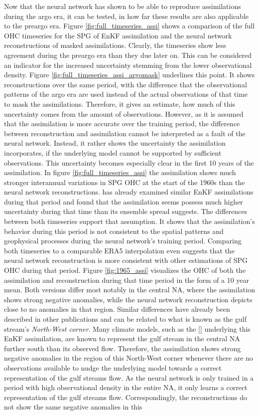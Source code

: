 \documentclass[11pt,a4paper]{scrreprt}	%
\begin{document}
	Now that the neural network has shown to be able to reproduce assimilations during the argo era, it can be tested, in how far these results are also applicable to the preargo era. Figure \ref{fig:full_timeseries_assi} shows a comparison of the full OHC timeseries for the SPG of EnKF assimilation and the neural network reconstructions of masked assimilations. Clearly, the timeseries show less agreement during the preargo era than they due later on. This can be considered an indicator for the increased uncertainty stemming from the lower observational density. Figure \ref{fig:full_timeseries_assi_argomask} underlines this point. It shows reconstructions over the same period, with the difference that the observational patterns of the argo era are used instead of the actual observations of that time to mask the assimilations. Therefore, it gives an estimate, how much of this uncertainty comes from the amount of observations. However, as it is assumed that the assimilation is more accurate over the training period, the difference between reconstruction and assimilation cannot be interpreted as a fault of the neural network. Instead, it rather shows the uncertainty the assimilation incorporates, if the underlying model cannot be supported by sufficient observations. This uncertainty becomes especially clear in the first 10 years of the assimilation. In figure \ref{fig:full_timeseries_assi} the assimilation shows much stronger interannual variations in SPG OHC at the start of the 1960s than the neural network reconstructions. \cite{vimal_personal} has already examined similar EnKF assimilations during that period and found that the assimilation seems possess much higher uncertainty during that time than its ensemble spread suggests. The differences between both timeseries support that assumption. It shows that the assimilation's behavior during this period is not consistent to the spatial patterns and geophysical processes during the neural network's training period. Comparing both timeseries to a comparable ERA5 interpolation even suggests that the neural network reconstruction is more consistent with other estimations of SPG OHC during that period. Figure \ref{fig:1965_assi} visualizes the OHC of both the assimilation and reconstruction during that time period in the form of a 10 year mean. Both versions differ most notably in the central NA, where the assimilation shows strong negative anomalies, while the neural network reconstruction depicts close to no anomalies in that region. Similar differences have already been described in other publications and can be related to what is known as the gulf stream's \textit{North-West corner}. Many climate models, such as the [] underlying this EnKF assimilation, are known to represent the gulf stream in the central NA further south than its observed flow. Therefore, the assimilation shows strong negative anomalies in the region of this North-West corner whenever there are no observations available to nudge the underlying model towards a correct representation of the gulf streams flow. As the neural network is only trained in a period with high observational density in the entire NA, it only learns a correct representation of the gulf streams flow. Correspondingly, the reconstructions do not show the same negative anomalies in this 
\end{document}
